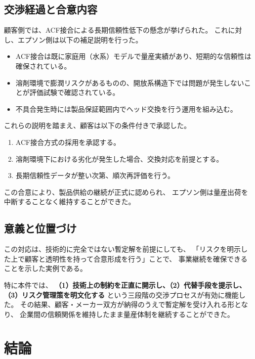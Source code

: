 \documentclass[conference]{IEEEtran}
\begin{document}
\subsection{交渉経過と合意内容}
顧客側では、ACF接合による長期信頼性低下の懸念が挙げられた。  
これに対し、エプソン側は以下の補足説明を行った。

\begin{itemize}
  \item ACF接合は既に家庭用（水系）モデルで量産実績があり、短期的な信頼性は確保されている。  
  \item 溶剤環境で膨潤リスクがあるものの、開放系構造下では問題が発生しないことが評価試験で確認されている。  
  \item 不具合発生時には製品保証範囲内でヘッド交換を行う運用を組み込む。  
\end{itemize}

これらの説明を踏まえ、顧客は以下の条件付きで承認した。

\begin{enumerate}
  \item ACF接合方式の採用を承認する。  
  \item 溶剤環境下における劣化が発生した場合、交換対応を前提とする。  
  \item 長期信頼性データが整い次第、順次再評価を行う。  
\end{enumerate}

この合意により、製品供給の継続が正式に認められ、  
エプソン側は量産出荷を中断することなく維持することができた。

\subsection{意義と位置づけ}
この対応は、技術的に完全ではない暫定解を前提にしても、  
「リスクを明示した上で顧客と透明性を持って合意形成を行う」ことで、  
事業継続を確保できることを示した実例である。  

特に本件では、  
\textbf{（1）技術上の制約を正直に開示し、（2）代替手段を提示し、（3）リスク管理策を明文化する}  
という三段階の交渉プロセスが有効に機能した。  
その結果、顧客・メーカー双方が納得のうえで暫定解を受け入れる形となり、  
企業間の信頼関係を維持したまま量産体制を継続することができた。

\section{結論}
\end{document}
